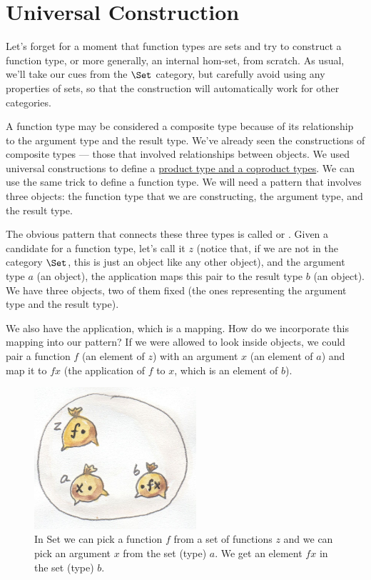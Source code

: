 \section{Universal Construction}

Let's forget for a moment that function types are sets and try to
construct a function type, or more generally, an internal hom-set, from
scratch. As usual, we'll take our cues from the $\Set$ category,
but carefully avoid using any properties of sets, so that the
construction will automatically work for other categories.

A function type may be considered a composite type because of its
relationship to the argument type and the result type. We've already
seen the constructions of composite types --- those that involved
relationships between objects. We used universal constructions to define
a \hyperref[products-and-coproducts]{product
type and a coproduct types}. We can use the same trick to define a
function type. We will need a pattern that involves three objects: the
function type that we are constructing, the argument type, and the
result type.

The obvious pattern that connects these three types is called
 or . Given a candidate for
a function type, let's call it $z$ (notice that, if we are not in
the category $\Set$, this is just an object like any other
object), and the argument type $a$ (an object), the application
maps this pair to the result type $b$ (an object). We have three
objects, two of them fixed (the ones representing the argument type and
the result type).

We also have the application, which is a mapping. How do we incorporate
this mapping into our pattern? If we were allowed to look inside
objects, we could pair a function $f$ (an element of $z$)
with an argument $x$ (an element of $a$) and map it to
$f x$ (the application of $f$ to $x$, which is an
element of $b$).

\begin{figure}
\centering
\includegraphics[width=60mm]{images/functionset.jpg}
\caption{In Set we can pick a function $f$ from a set of functions $z$ and we can
pick an argument $x$ from the set (type) $a$. We get an element $f x$ in the
set (type) $b$.}
\end{figure}

